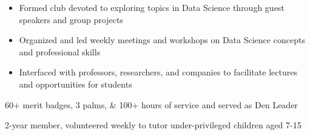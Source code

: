 \documentclass[10pt, letterpaper]{awesome-cv}
\begin{document}
\begin{skills}
    {\vspace*{-2.5ex}
    \begin{itemize}[noitemsep, label=\bullet]
        \item Formed club devoted to exploring topics in Data Science through guest speakers and group projects
        \item Organized and led weekly meetings and workshops on Data Science concepts and professional skills
        \item Interfaced with professors, researchers, and companies to facilitate lectures and opportunities for students
    \end{itemize}
    \vspace*{-3.5ex}}
    
    
    
    
    
    {60+ merit badges, 3 palms, \& 100+ hours of service and served as Den Leader}
    
    {2-year member, volunteered weekly to tutor under-privileged children aged 7-15}
\end{skills}
\end{document}
